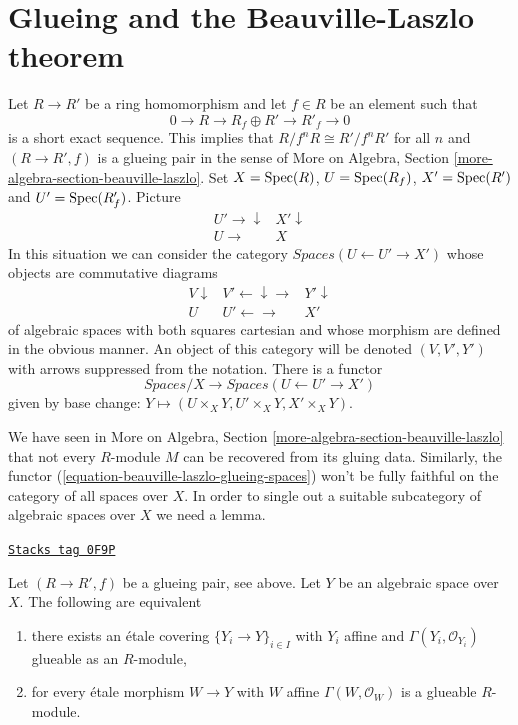 \section{Glueing and the Beauville-Laszlo theorem}
\label{spaces-pushouts-section-glueing-beauville-laszlo}
Let $R \to R'$ be a ring homomorphism and let $f \in R$ be an element such that
$$
0 \to R \to R_f \oplus R' \to R'_f \to 0
$$
is a short exact sequence. This implies that $R/f^nR \cong R'/f^nR'$
for all $n$ and $(R \to R', f)$ is a glueing pair in the sense of
More on Algebra, Section \ref{more-algebra-section-beauville-laszlo}.
Set $X = \operatorname{Spec}(R)$, $U = \operatorname{Spec}(R_f)$, $X' = \operatorname{Spec}(R')$ and
$U' = \operatorname{Spec}(R'_f)$. Picture
$$
\begin{array}{cc}U' \longrightarrow\downarrow & X' \downarrow \\ U \longrightarrow & X\end{array}
$$
In this situation we can consider the category
$\textit{Spaces}(U \leftarrow U' \to X')$ whose objects
are commutative diagrams
$$
\begin{array}{ccc}V \downarrow & V' \longleftarrow\downarrow\longrightarrow & Y' \downarrow \\ U & U' \longleftarrow\longrightarrow & X'\end{array}
$$
of algebraic spaces with both squares cartesian and whose morphism
are defined in the obvious manner. An object of this category will
be denoted $(V, V', Y')$ with arrows suppressed from the notation.
There is a functor
\begin{equation}
\label{equation-beauville-laszlo-glueing-spaces}
\textit{Spaces}/X
\longrightarrow
\textit{Spaces}(U \leftarrow U' \to X')
\end{equation}
given by base change: $Y \mapsto (U \times_X Y, U' \times_X Y, X' \times_X Y)$.

\medskip\noindent
We have seen in
More on Algebra, Section \ref{more-algebra-section-beauville-laszlo}
that not every $R$-module $M$ can be recovered from its
gluing data. Similarly, the functor
(\ref{equation-beauville-laszlo-glueing-spaces})
won't be fully faithful on the category of all spaces over $X$.
In order to single out a suitable subcategory of algebraic
spaces over $X$ we need a lemma.

\begin{lemma}[Glueable]
\label{spaces-pushouts-lemma-glueable}
\href{https://stacks.math.columbia.edu/tag/0F9P}{\texttt{Stacks tag 0F9P}}

Let $(R \to R', f)$ be a glueing pair, see above. Let $Y$ be an algebraic
space over $X$. The following are equivalent
\begin{enumerate}
\item there exists an \'etale covering $\{Y_i \to Y\}_{i \in I}$
with $Y_i$ affine and $\Gamma(Y_i, \mathcal{O}_{Y_i})$
glueable as an $R$-module,
\item for every \'etale morphism $W \to Y$ with $W$ affine
$\Gamma(W, \mathcal{O}_W)$ is a glueable $R$-module.
\end{enumerate}
\end{lemma}

